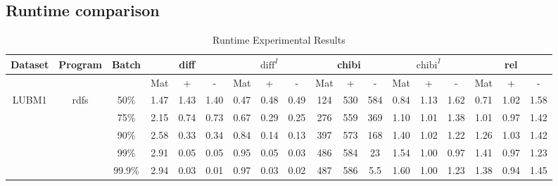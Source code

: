 \documentclass[sigconf,screen,review=false,natbib]{acmart}
\theoremstyle{definition}
\begin{document}
\subsection{Runtime comparison}
\begin{table*}
	\caption{Runtime Experimental Results}
	\begin{center}
		\begin{tabular}{|c|c|c|c|c|c|c|c|c|c|c|c|c|c|c|c|c|c|}
			\hline
			Dataset & Program                 & Batch  & \multicolumn{3}{c|}{diff} & \multicolumn{3}{c|}{$\text{diff}^{I}$} & \multicolumn{3}{c|}{chibi} & \multicolumn{3}{c|}{$\text{chibi}^{I}$} & \multicolumn{3}{c|}{rel}                                                                       \\
			\hline
			        &                         &        & Mat                       & +                                      & -                          & Mat                                     & +                        & -    & Mat  & +    & -    & Mat  & +    & -    & Mat  & +    & -    \\
			\hline
			LUBM1   & \multirow{6}{*}{rdfs}   & 50\%   & 1.47                      & 1.43                                   & 1.40                       & 0.47                                    & 0.48                     & 0.49 & 124  & 530  & 584  & 0.84 & 1.13 & 1.62 & 0.71 & 1.02 & 1.58 \\
			        &                         & 75\%   & 2.15                      & 0.74                                   & 0.73                       & 0.67                                    & 0.29                     & 0.25 & 276  & 559  & 369  & 1.10 & 1.01 & 1.38 & 1.01 & 0.97 & 1.42 \\
			        &                         & 90\%   & 2.58                      & 0.33                                   & 0.34                       & 0.84                                    & 0.14                     & 0.13 & 397  & 573  & 168  & 1.40 & 1.02 & 1.22 & 1.26 & 1.03 & 1.42 \\
			        &                         & 99\%   & 2.91                      & 0.05                                   & 0.05                       & 0.95                                    & 0.05                     & 0.03 & 486  & 584  & 23   & 1.54 & 1.00 & 0.97 & 1.41 & 0.97 & 1.23 \\
			        &                         & 99.9\% & 2.94                      & 0.03                                   & 0.01                       & 0.97                                    & 0.03                     & 0.02 & 487  & 586  & 5.5  & 1.60 & 1.00 & 1.23 & 1.38 & 0.94 & 1.45 \\

\end{tabular}
\end{center}
\end{table*}
\end{document}
